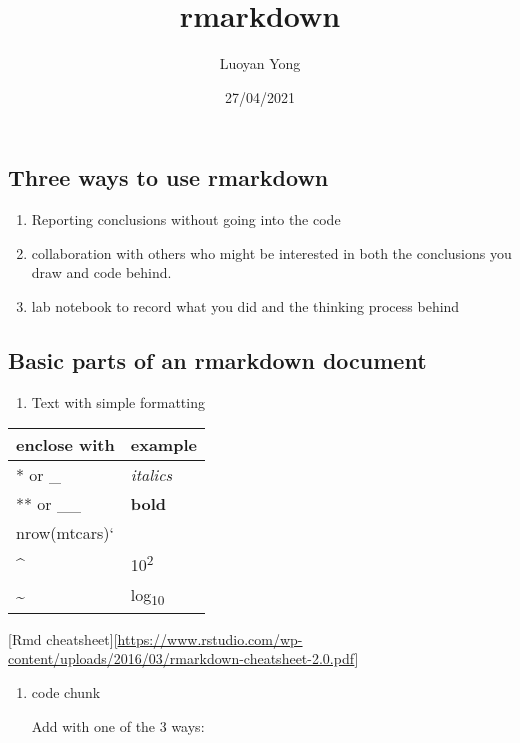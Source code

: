 \documentclass[
]{article}
\title{rmarkdown}
\author{Luoyan Yong}
\date{27/04/2021}
\providecommand{\tightlist}{%
  \setlength{\itemsep}{0pt}\setlength{\parskip}{0pt}}
\begin{document}
\maketitle

\hypertarget{three-ways-to-use-rmarkdown}{%
\subsection{Three ways to use
rmarkdown}\label{three-ways-to-use-rmarkdown}}

\begin{enumerate}
\def\labelenumi{\arabic{enumi}.}
\tightlist
\item
  Reporting conclusions without going into the code
\item
  collaboration with others who might be interested in both the
  conclusions you draw and code behind.
\item
  lab notebook to record what you did and the thinking process behind
\end{enumerate}

\hypertarget{basic-parts-of-an-rmarkdown-document}{%
\subsection{Basic parts of an rmarkdown
document}\label{basic-parts-of-an-rmarkdown-document}}

\begin{enumerate}
\def\labelenumi{\arabic{enumi}.}
\tightlist
\item
  Text with simple formatting
\end{enumerate}

\begin{longtable}[]{@{}ll@{}}
\toprule
enclose with & example \\
\midrule
\endhead
* or \_ & \emph{italics} \\
** or \_\_ & \textbf{bold} \\
\texttt{\textbar{}}nrow(mtcars)` & \\
\^{} & 10\textsuperscript{2} \\
\textasciitilde{} & log\textsubscript{10} \\
\bottomrule
\end{longtable}

{[}Rmd
cheatsheet{]}{[}\url{https://www.rstudio.com/wp-content/uploads/2016/03/rmarkdown-cheatsheet-2.0.pdf}{]}

\begin{enumerate}
\def\labelenumi{\arabic{enumi}.}
\setcounter{enumi}{1}
\item
  code chunk

  Add with one of the 3 ways:
\end{enumerate}
\end{document}
